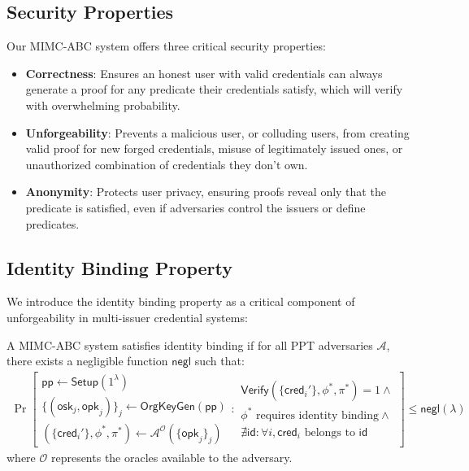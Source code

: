 \subsection{Security Properties}
Our MIMC-ABC system offers three critical security properties:

\begin{itemize}
    \item \textbf{Correctness}: Ensures an honest user with valid credentials can always generate a proof for any predicate their credentials satisfy, which will verify with overwhelming probability.

    \item \textbf{Unforgeability}: Prevents a malicious user, or colluding users, from creating valid proof for new forged credentials, misuse of legitimately issued ones, or unauthorized combination of credentials they don't own.

    \item \textbf{Anonymity}: Protects user privacy, ensuring proofs reveal only that the predicate is satisfied, even if adversaries control the issuers or define predicates.
\end{itemize}

\subsection{Identity Binding Property}
We introduce the identity binding property as a critical component of unforgeability in multi-issuer credential systems:

\begin{definition}
A MIMC-ABC system satisfies identity binding if for all PPT adversaries $\mathcal{A}$, there exists a negligible function $\mathsf{negl}$ such that:
\begin{align*}
\Pr\left[\begin{array}{l}
    \mathsf{pp} \gets \mathsf{Setup}(1^\lambda) \\
    \{(\mathsf{osk}_j, \mathsf{opk}_j)\}_j \gets \mathsf{OrgKeyGen}(\mathsf{pp}) \\
    (\{\mathsf{cred}_i'\}, \phi^*, \pi^*) \gets \mathcal{A}^{\mathcal{O}}(\{\mathsf{opk}_j\}_j)
\end{array}
: \begin{array}{l}
    \mathsf{Verify}(\{\mathsf{cred}_i'\}, \phi^*, \pi^*) = 1 \land \\
    \phi^* \text{ requires identity binding} \land \\
    \nexists \mathsf{id} : \forall i, \mathsf{cred}_i \text{ belongs to } \mathsf{id}
\end{array}\right] \leq \mathsf{negl}(\lambda)
\end{align*}
where $\mathcal{O}$ represents the oracles available to the adversary.
\end{definition}

